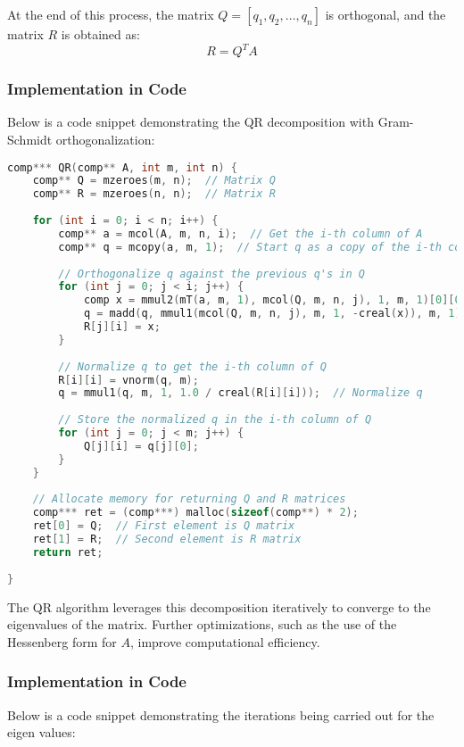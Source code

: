 \documentclass[journal,12pt,onecolumn]{IEEEtran}
\theoremstyle{remark}
\begin{document}
	At the end of this process, the matrix \( Q = [q_1, q_2, \ldots, q_n] \) is orthogonal, and the matrix \( R \) is obtained as:
	\[
	R = Q^T A
	\]
\newpage	
	\subsubsection{Implementation in Code}
	Below is a code snippet demonstrating the QR decomposition with Gram-Schmidt orthogonalization:

\begin{lstlisting}[language=C]
comp*** QR(comp** A, int m, int n) {
	comp** Q = mzeroes(m, n);  // Matrix Q
	comp** R = mzeroes(n, n);  // Matrix R
	
	for (int i = 0; i < n; i++) {
		comp** a = mcol(A, m, n, i);  // Get the i-th column of A
		comp** q = mcopy(a, m, 1);  // Start q as a copy of the i-th column of A
		
		// Orthogonalize q against the previous q's in Q
		for (int j = 0; j < i; j++) {
			comp x = mmul2(mT(a, m, 1), mcol(Q, m, n, j), 1, m, 1)[0][0];
			q = madd(q, mmul1(mcol(Q, m, n, j), m, 1, -creal(x)), m, 1);
			R[j][i] = x;
		}
		
		// Normalize q to get the i-th column of Q
		R[i][i] = vnorm(q, m);
		q = mmul1(q, m, 1, 1.0 / creal(R[i][i]));  // Normalize q
		
		// Store the normalized q in the i-th column of Q
		for (int j = 0; j < m; j++) {
			Q[j][i] = q[j][0];
		}
	}
	
	// Allocate memory for returning Q and R matrices
	comp*** ret = (comp***) malloc(sizeof(comp**) * 2);
	ret[0] = Q;  // First element is Q matrix
	ret[1] = R;  // Second element is R matrix
	return ret;
	
}
	\end{lstlisting}
	
	The QR algorithm leverages this decomposition iteratively to converge to the eigenvalues of the matrix. Further optimizations, such as the use of the Hessenberg form for \( A \), improve computational efficiency.
	
\newpage	
\subsubsection{Implementation in Code}
Below is a code snippet demonstrating the iterations being carried out for the eigen values:
\end{document}
